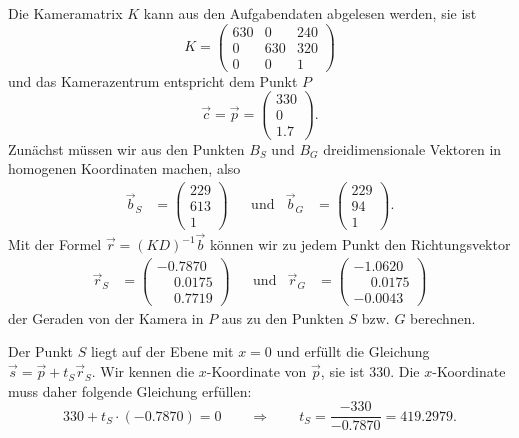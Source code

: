 \begin{loesung}
\begin{teilaufgaben}
\item
Die Kameramatrix $K$ kann aus den Aufgabendaten abgelesen werden, sie ist
\[
K
=
\begin{pmatrix}
630&  0&240\\
  0&630&320\\
  0&  0&  1
\end{pmatrix}
\]
und das Kamerazentrum entspricht dem Punkt $P$
\[
\vec c = \vec p = 
\begin{pmatrix}
330\\ 0\\ 1.7
\end{pmatrix}.
\]
Zunächst müssen wir aus den Punkten $B_S$ und $B_G$ dreidimensionale Vektoren
in homogenen Koordinaten machen, also
\[
\begin{aligned}
\vec b_S &= \begin{pmatrix}229\\613\\1\end{pmatrix}
&&\text{und}&
\vec b_G &= \begin{pmatrix}229\\94\\1\end{pmatrix}.
\end{aligned}
\]
Mit der Formel $\vec{r} = (KD)^{-1} \vec b$ können wir zu jedem Punkt
den Richtungsvektor
\[
\begin{aligned}
\vec r_S
&=
\begin{pmatrix}
-0.7870 \\
\phantom{-}0.0175 \\
\phantom{-}0.7719
\end{pmatrix}
&&\text{und}&
\vec r_G &= 
\begin{pmatrix}
-1.0620 \\
\phantom{-}0.0175 \\
-0.0043
\end{pmatrix}
\end{aligned}
\]
der Geraden von der Kamera in $P$ aus zu den Punkten $S$ bzw. $G$ berechnen.

Der Punkt $S$ liegt auf der Ebene mit $x=0$ und erfüllt die
Gleichung $\vec s = \vec {p} + t_S\vec{r}_S$.
Wir kennen die $x$-Koordinate von $\vec{p}$, sie ist $330$.
Die $x$-Koordinate muss daher folgende Gleichung erfüllen:
\[
330 + t_S\cdot (-0.7870) = 0
\qquad\Rightarrow\qquad
t_S = \frac{-330}{-0.7870}=419.2979.
\]


\end{teilaufgaben}
\end{loesung}
